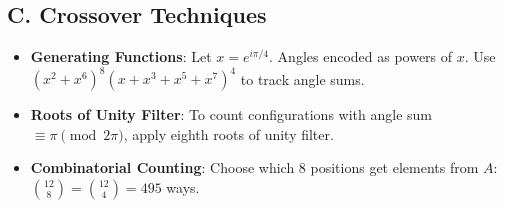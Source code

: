 \documentclass[]{article}
\begin{document}
\begin{tacticalbox}
\subsection*{C. Crossover Techniques}
\begin{itemize}[leftmargin=*]
    \item \textbf{Generating Functions}: Let $x = e^{i\pi/4}$. Angles encoded as powers of $x$. Use $(x^2 + x^6)^8 (x + x^3 + x^5 + x^7)^4$ to track angle sums.
    \item \textbf{Roots of Unity Filter}: To count configurations with angle sum $\equiv \pi \pmod{2\pi}$, apply eighth roots of unity filter.
    \item \textbf{Combinatorial Counting}: Choose which 8 positions get elements from $A$: $\binom{12}{8} = \binom{12}{4} = 495$ ways.
\end{itemize}
\end{tacticalbox}
\end{document}
